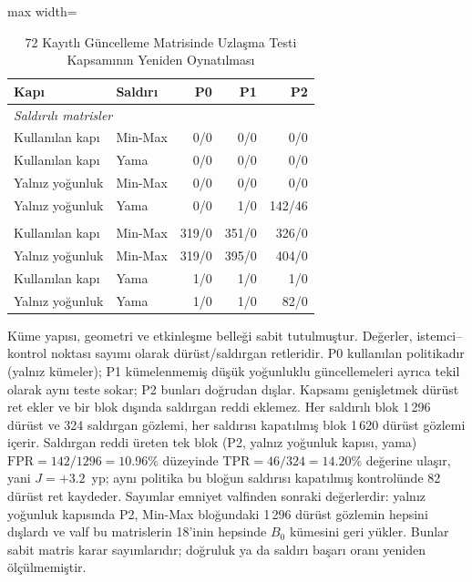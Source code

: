\begin{table}[!t]
\centering\footnotesize
\setlength{\tabcolsep}{4pt}
\caption{72 Kayıtlı Güncelleme Matrisinde Uzlaşma Testi Kapsamının Yeniden Oynatılması}\label{tab:coverage_replay}
\begin{adjustbox}{max width=\columnwidth}
\begin{tabular}{llrrr}
\toprule
Kapı & Saldırı & P0 & P1 & P2 \\
\midrule
\multicolumn{5}{l}{\emph{Saldırılı matrisler}} \\
\quad Kullanılan kapı & Min-Max & 0/0 & 0/0 & 0/0 \\
\quad Kullanılan kapı & Yama & 0/0 & 0/0 & 0/0 \\
\quad Yalnız yoğunluk & Min-Max & 0/0 & 0/0 & 0/0 \\
\quad Yalnız yoğunluk & Yama & 0/0 & 1/0 & 142/46 \\
\addlinespace[3pt]
\multicolumn{5}{l}{\emph{Saldırısı kapatılmış kontroller}} \\
\quad Kullanılan kapı & Min-Max & 319/0 & 351/0 & 326/0 \\
\quad Yalnız yoğunluk & Min-Max & 319/0 & 395/0 & 404/0 \\
\quad Kullanılan kapı & Yama & 1/0 & 1/0 & 1/0 \\
\quad Yalnız yoğunluk & Yama & 1/0 & 1/0 & 82/0 \\
\bottomrule
\end{tabular}
\end{adjustbox}

\par\vspace{3pt}\parbox{\linewidth}{\footnotesize Küme yapısı, geometri ve etkinleşme belleği sabit tutulmuştur. Değerler, istemci--kontrol noktası sayımı olarak dürüst/saldırgan retleridir. P0 kullanılan politikadır (yalnız kümeler); P1 kümelenmemiş düşük yoğunluklu güncellemeleri ayrıca tekil olarak aynı teste sokar; P2 bunları doğrudan dışlar. Kapsamı genişletmek dürüst ret ekler ve bir blok dışında saldırgan reddi eklemez. Her saldırılı blok 1\,296 dürüst ve 324 saldırgan gözlemi, her saldırısı kapatılmış blok 1\,620 dürüst gözlemi içerir. Saldırgan reddi üreten tek blok (P2, yalnız yoğunluk kapısı, yama) $\mathrm{FPR}=142/1296=10.96\%$ düzeyinde $\mathrm{TPR}=46/324=14.20\%$ değerine ulaşır, yani $J=+3.2$~yp; aynı politika bu bloğun saldırısı kapatılmış kontrolünde 82 dürüst ret kaydeder. Sayımlar emniyet valfinden sonraki değerlerdir: yalnız yoğunluk kapısında P2, Min-Max bloğundaki 1\,296 dürüst gözlemin hepsini dışlardı ve valf bu matrislerin 18'inin hepsinde $B_0$ kümesini geri yükler. Bunlar sabit matris karar sayımlarıdır; doğruluk ya da saldırı başarı oranı yeniden ölçülmemiştir.}
\end{table}
